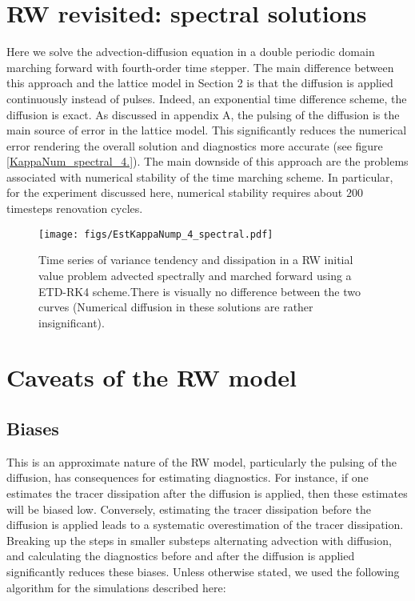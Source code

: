 \documentclass[11pt]{article}
\begin{document}
\section{RW revisited: spectral solutions}
Here we solve the advection-diffusion equation in a double periodic domain marching forward with fourth-order time stepper.
The main difference between this approach and the lattice model in Section 2 is that the diffusion is applied continuously instead of pulses. Indeed, an exponential time difference scheme, the diffusion is exact. As discussed in appendix A, the pulsing of the diffusion is the main source of error in the lattice model. This significantly reduces the numerical error rendering the overall solution and diagnostics more accurate (see figure \ref{KappaNum_spectral_4.}). The main downside of this approach are the problems associated with numerical stability of the time marching scheme. In particular, for the experiment discussed here, numerical stability requires about $200$ timesteps renovation cycles. 

 \begin{figure}[ht]
    \centering
    \texttt{[image: figs/EstKappaNump\_4\_spectral.pdf]}
    \caption{\small Time series of variance tendency and dissipation in a RW initial value problem advected spectrally
    and marched forward using a ETD-RK4 scheme.There is visually no difference between the two curves (Numerical diffusion
    in these solutions are rather insignificant).}
        \label{KappaNum_spectral_4}
\end{figure}

\clearpage

\appendix

\section{Caveats of the RW model}

\subsection{Biases}
 This is an approximate nature of the RW model, particularly the pulsing of the diffusion, has consequences for estimating diagnostics. For instance, if one estimates the tracer dissipation after the diffusion is applied, then these estimates will be biased low. Conversely, estimating the tracer dissipation before the diffusion is applied leads to a systematic overestimation of the tracer dissipation. Breaking up the steps in smaller substeps alternating advection with diffusion, and calculating the diagnostics before and after the diffusion is applied significantly reduces these biases. Unless otherwise stated, we used the following algorithm for the simulations described here: \\
\end{document}
